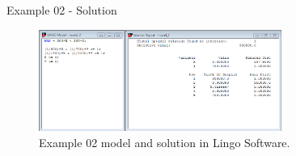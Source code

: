 \begin{frame}{Example 02 - Solution}
\begin{figure}
    \includegraphics[width=300px]{slides/ex02/screenshot.png}
    \caption{Example 02 model and solution in Lingo Software.}
\end{figure}
\end{frame}
